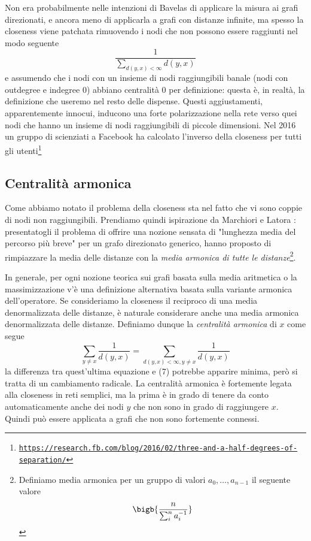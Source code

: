 Non era probabilmente nelle intenzioni di Bavelas di applicare la misura ai grafi direzionati, e ancora meno di applicarla a grafi con distanze infinite, ma spesso la closeness viene patchata rimuovendo i nodi che non possono essere raggiunti nel modo seguente
\begin{equation}
	\frac{1}{\sum_{d(y, x) < \infty}d(y, x)}
\end{equation}
e assumendo che i nodi con un insieme di nodi raggiungibili banale (nodi con outdegree e indegree 0) abbiano centralità 0 per definizione: questa è, in realtà, la definizione che useremo nel resto delle dispense. Questi aggiustamenti, apparentemente innocui, inducono una forte polarizzazione nella rete verso quei nodi che hanno un insieme di nodi raggiungibili di piccole dimensioni. Nel 2016 un gruppo di scienziati a Facebook ha calcolato l'inverso della closeness per tutti gli utenti\footnote{\texttt{\href{https://research.fb.com/blog/2016/02/three-and-a-half-degrees-of-separation/}{https://research.fb.com/blog/2016/02/three-and-a-half-degrees-of-separation/}}}
\subsection{Centralità armonica}
Come abbiamo notato il problema della closeness sta nel fatto che vi sono coppie di nodi non raggiungibili. Prendiamo quindi ispirazione da Marchiori e Latora \cite{armonica}: presentatogli il problema di offrire una nozione sensata di "lunghezza media del percorso più breve" per un grafo direzionato generico, hanno proposto di rimpiazzare la media delle distanze con la \textit{media armonica di tutte le distanze}\footnote{Definiamo media armonica per un gruppo di valori $a_0, \dots, a_{n - 1}$ il seguente valore
	\begin{equation}
		\bigb{\frac{n}{\sum_i^n{a_i^{-1}}}}
	\end{equation}
}.

In generale, per ogni nozione teorica sui grafi basata sulla media aritmetica o la massimizzazione
v'è una definizione alternativa basata sulla variante armonica dell'operatore. Se consideriamo la closeness il reciproco di una media denormalizzata delle distanze, è naturale considerare anche una media armonica denormalizzata delle distanze. Definiamo dunque la \textit{centralità armonica} di $x$ come segue
\begin{equation}
	\sum_{y \neq x}{\frac{1}{d(y, x)}} = \sum_{d(y, x) < \infty, y \neq x}{\frac{1}{d(y, x)}}
\end{equation}
la differenza tra quest'ultima equazione e (7) potrebbe apparire minima, però si tratta di un cambiamento radicale. La centralità armonica è fortemente legata alla closeness in reti semplici, ma la prima è in grado di tenere da conto automaticamente anche dei nodi $y$ che non sono in grado di raggiungere $x$. Quindi può essere applicata a grafi che non sono fortemente connessi.
